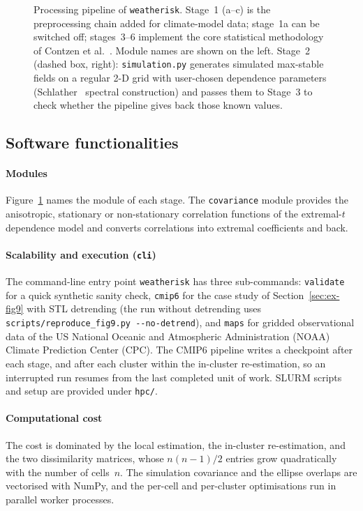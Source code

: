 \documentclass[preprint,12pt,a4paper]{elsarticle}
\begin{document}
\begin{figure}[ht]
\begin{tikzpicture}
\end{tikzpicture}
\caption{Processing pipeline of \texttt{weatherisk}. Stage~1
  (a--c) is the preprocessing chain added for climate-model data;
  stage~1a can be switched off;
  stages~3--6 implement the core statistical methodology of Contzen
  et al.~\cite{contzen2025}. Module names are shown on the left. Stage~2
  (dashed box, right): \texttt{simulation.py} generates simulated
  max-stable fields on a regular 2-D grid with user-chosen dependence
  parameters (Schlather~\cite{schlather2002} spectral construction) and passes them to
  Stage~3 to check whether the pipeline gives back those known
  values.}
\label{fig:workflow}
\end{figure}

\subsection{Software functionalities}
\label{sec:functionalities}

\paragraph{Modules}
Figure~\ref{fig:workflow} names the module of each stage. The \texttt{covariance} module provides
the anisotropic, stationary or non-stationary correlation functions
of the extremal-$t$ dependence model and converts correlations into
extremal coefficients and back.

\paragraph{Scalability and execution (\texttt{cli})}
The command-line entry point
\texttt{weatherisk} has three sub-commands: \texttt{validate} for a
quick synthetic sanity check, \texttt{cmip6} for the case study of
Section~\ref{sec:ex-fig9} with STL detrending (the run without
detrending uses \texttt{scripts/reproduce\_fig9.py -{}-no-detrend}),
and \texttt{maps} for gridded observational data of the US National
Oceanic and Atmospheric Administration (NOAA) Climate Prediction
Center (CPC). The CMIP6 pipeline writes a checkpoint after each
stage, and after each cluster within the in-cluster re-estimation, so an
interrupted run resumes from the last completed unit of work.
SLURM scripts and setup are provided
under \texttt{hpc/}.

\paragraph{Computational cost}
The cost is dominated by the local estimation, the in-cluster
re-estimation, and the two dissimilarity matrices, whose $n(n-1)/2$
entries grow quadratically with the number of cells~$n$. The
simulation covariance and the ellipse overlaps are vectorised with
NumPy, and the per-cell and per-cluster optimisations run in
parallel worker processes.
\end{document}
